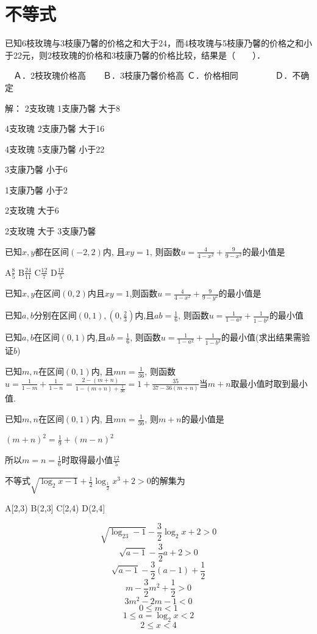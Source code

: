 \documentclass{articla}
\begin{document}
\section{不等式}
已知6枝玫瑰与3枝康乃馨的价格之和大于24，而4枝攻瑰与5枝康乃馨的价格之和小于22元，则2枝玫瑰的价格和3枝康乃馨的价格比较，结果是（　　）．

　Ａ．2枝玫瑰价格高　　Ｂ．3枝康乃馨价格高     Ｃ．价格相同　　　　 Ｄ．不确定

解：
2支玫瑰 1支康乃馨 大于8

4支玫瑰 2支康乃馨 大于16

4支玫瑰 5支康乃馨 小于22

3支康乃馨 小于6

1支康乃馨 小于2

2支玫瑰 大于6

2支玫瑰 大于 3支康乃馨





已知$x,y$都在区间$(-2,2)$内, 且$xy=1$, 则函数$u=\frac{4}{4-x^2}+\frac9{9-x^2}$的最小值是

A$\frac85$  B$\frac{24}{11}$ C$\frac{12}7$ D$\frac{12}5$

已知$x,y$在区间$(0,2)$内且$xy=1$,则函数$u=\frac4{4-x^2}+\frac9{9-y^2}$的最小值是

已知$a,b$分别在区间$(0,1),(0,\frac23)$内,且$ab=\frac16$, 则函数$u=\frac1{1-a^2}+\frac1{1-b^2}$的最小值

已知$a,b$在区间$(0,1)$内,且$ab=\frac16$, 则函数$u=\frac1{1-a^2}+\frac1{1-b^2}$的最小值(求出结果需验证$b$)

已知$m,n$在区间$(0,1)$内, 且$mn=\frac1{36}$, 则函数$u=\frac1{1-m}+\frac1{1-n}=\frac{2-(m+n)}{1-(m+n)+\frac1{36}}=1+\frac{35}{37-36(m+n)}$当$m+n$取最小值时取到最小值.

已知$m,n$在区间$(0,1)$内, 且$mn=\frac1{36}$, 则$m+n$的最小值是

$(m+n)^2=\frac19+(m-n)^2$

所以$m=n=\frac16$时取得最小值$\frac{12}5$






不等式$\sqrt{\log_2x-1}+\frac12\log_{\frac12}x^3+2>0$的解集为

A[2,3)  B(2,3] C[2,4) D(2,4]

$$\sqrt{\log_23-1}-\frac32\log_2x+2>0$$
$$\sqrt{a-1}-\frac32a+2>0$$
$$\sqrt{a-1}-\frac32(a-1)+\frac12$$
$$m-\frac32m^2+\frac12>0$$
$$3m^2-2m-1<0$$
$$0\le m<1$$
$$1\le a=\log_2x<2$$
$$2\le x<4$$
\end{document}

